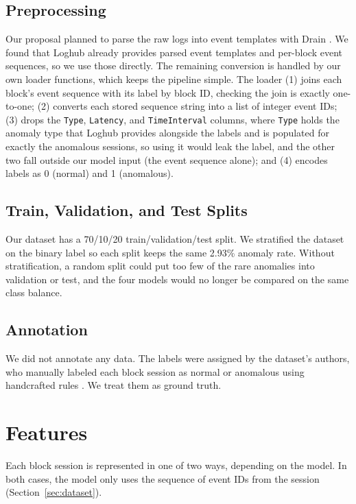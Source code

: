 \documentclass[11pt]{article}
\begin{document}
\subsection{Preprocessing}
Our proposal planned to parse the raw logs into event templates with Drain
\citep{8029742}. We found that Loghub already provides parsed event templates and
per-block event sequences, so we use those directly. The remaining conversion is handled
by our own loader functions, which keeps the pipeline simple. The loader (1) joins each
block's event sequence with its label by block ID, checking the join is exactly
one-to-one; (2) converts each stored sequence string into a list of integer event IDs;
(3) drops the \texttt{Type}, \texttt{Latency}, and \texttt{TimeInterval} columns, where
\texttt{Type} holds the anomaly type that Loghub provides alongside the labels
\citep{Loghub} and is populated for exactly the anomalous sessions, so using it
would leak the label, and the other two fall outside our model input (the event sequence
alone); and (4) encodes labels as 0 (normal) and 1 (anomalous).

\subsection{Train, Validation, and Test Splits}
Our dataset has a 70/10/20 train/validation/test split. We stratified the dataset on the binary
label so each split keeps the same 2.93\% anomaly rate. Without stratification, a
random split could put too few of the rare anomalies into validation or test, and the
four models would no longer be compared on the same class balance.

\subsection{Annotation}
We did not annotate any data. The labels were assigned by the dataset's authors, who
manually labeled each block session as normal or anomalous using handcrafted rules
\citep{Loghub}. We treat them as ground truth.


\section{Features}\label{sec:features}

Each block session is represented in one of two ways, depending on the model. In both cases, the model only uses the sequence of event IDs from the session (Section~\ref{sec:dataset}).
\end{document}
